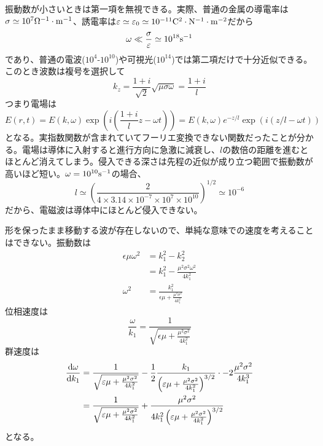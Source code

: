     振動数が小さいときは第一項を無視できる。実際、普通の金属の導電率は$\sigma \simeq 10^7 {\rm \Omega^{-1} \cdot m^{-1}}$、誘電率は$\epsilon \simeq \epsilon_0 \simeq 10^{-11}{\rm C^2 \cdot N^{-1} \cdot m^{-2}}$だから
        \[\omega \ll \frac{\sigma}{\epsilon} \simeq 10^{18}{\rm s^{-1}}\]
    であり、普通の電波($10^4$-$10^{10}$)や可視光($10^{14}$)では第二項だけで十分近似できる。このとき波数は複号を選択して
        \[k_z = \frac{1 + i}{\sqrt{2}}\sqrt{\mu\sigma\omega} = \frac{1 + i}{l}\]
    つまり電場は
        \[E(r, t) = E(k, \omega)\exp\left(i\left(\frac{1 + i}{l}z - \omega t\right)\right) = E(k, \omega)e^{-z/l}\exp(i(z/l - \omega t))\]
    となる。実指数関数が含まれていてフーリエ変換できない関数だったことが分かる。電場は導体に入射すると進行方向に急激に減衰し、$l$の数倍の距離を進むとほとんど消えてしまう。侵入できる深さは先程の近似が成り立つ範囲で振動数が高いほど短い。$\omega = 10^{10}{\rm s^{-1}}$の場合、
        \[l \simeq \left(\frac{2}{4\times 3.14\times 10^{-7}\times 10^7\times 10^{10}}\right)^{1/2} \simeq 10^{-6}\]
    だから、電磁波は導体中にほとんど侵入できない。

    形を保ったまま移動する波が存在しないので、単純な意味での速度を考えることはできない。振動数は
    \begin{align*}
        \epsilon\mu\omega^2
        &= k_1^2 - k_2^2\\
        &= k_1^2 - \frac{\mu^2\sigma^2\omega^2}{4k_1^2}\\
        \omega^2
        &= \frac{k_1^2}{\epsilon\mu + \frac{\mu^2\sigma^2}{4k_1^2}}
    \end{align*}
    位相速度は
        \[\frac{\omega}{k_1} = \frac{1}{\sqrt{\epsilon\mu + \frac{\mu^2\sigma^2}{4k_1^2}}}\]
    群速度は
    \begin{align*}
        \dv{\omega}{k_1}
        &= \frac{1}{\sqrt{\epsilon\mu + \frac{\mu^2\sigma^2}{4k_1^2}}} - \frac{1}{2}\frac{k_1}{\left(\epsilon\mu + \frac{\mu^2\sigma^2}{4k_1^2}\right)^{3/2}} \cdot -2 \frac{\mu^2\sigma^2}{4k_1^3}\\
        &= \frac{1}{\sqrt{\epsilon\mu + \frac{\mu^2\sigma^2}{4k_1^2}}} + \frac{\mu^2\sigma^2}{4k_1^2\left(\epsilon\mu + \frac{\mu^2\sigma^2}{4k_1^2}\right)^{3/2}}
    \end{align*}
    となる。

